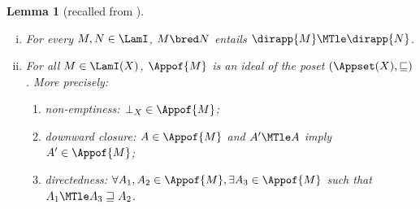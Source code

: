 \documentclass[10pt,a4paper]{amsart}
\newtheorem{lemma}[theorem]{Lemma}
\theoremstyle{definition}
\newcommand{\bsub}{\begin{enumerate}[(i)]}
\newcommand{\esub}{\end{enumerate}}
\begin{document}
\begin{lemma}[recalled from ] \mbox{}
\bsub
\item
	For every $M,N\in\LamI$, $M\bred N$ entails  $\dirapp{M} \MTle 
	\dirapp{N}$.
\item
	For all $M\in\LamI(X)$, $\Appof{M}$ is an ideal of the poset 
	$(\Appset(X),\sqsubseteq)$. More precisely:
	\begin{enumerate}
	\item
		non-emptiness: $\bot_X\in \Appof{M}$;
	\item
		downward closure: $A\in \Appof{M}$ and $A'\MTle A$ imply 
		$A'\in\Appof{M}$;
	\item
		directedness: $\forall A_1,A_2\in\Appof{M},\exists A_3\in\Appof{M}$ 
		such that $A_1\MTle A_3 \sqsupseteq A_2$.
	\end{enumerate}
\esub
\end{lemma}
\end{document}
